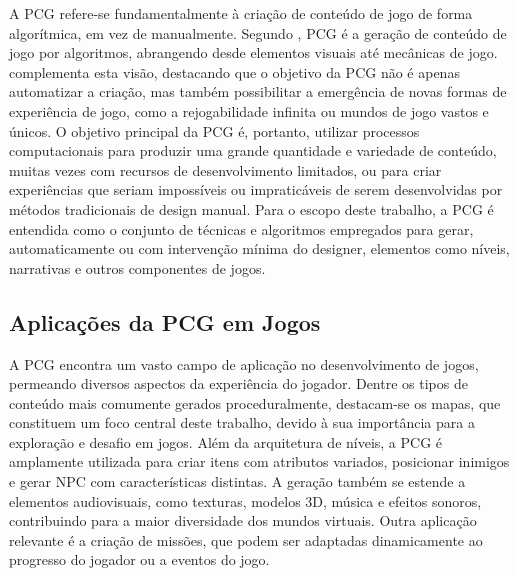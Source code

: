 A \gls{PCG} refere-se fundamentalmente à criação de conteúdo de jogo de forma
algorítmica, em vez de manualmente. Segundo ,
\gls{PCG} é a geração de conteúdo de jogo por algoritmos, abrangendo desde
elementos visuais até mecânicas de jogo.  complementa esta
visão, destacando que o objetivo da \gls{PCG} não é apenas automatizar a
criação, mas também possibilitar a emergência de novas formas de experiência de
jogo, como a rejogabilidade infinita ou mundos de jogo vastos e únicos. O
objetivo principal da \gls{PCG} é, portanto, utilizar processos computacionais
para produzir uma grande quantidade e variedade de conteúdo, muitas vezes com
recursos de desenvolvimento limitados, ou para criar experiências que seriam
impossíveis ou impraticáveis de serem desenvolvidas por métodos tradicionais de
design manual. Para o escopo deste trabalho, a \gls{PCG} é entendida como o
conjunto de técnicas e algoritmos empregados para gerar, automaticamente ou com
intervenção mínima do designer, elementos como níveis, narrativas e outros
componentes de jogos.

\subsection{Aplicações da \texorpdfstring{\gls{PCG}}{PCG} em Jogos}
\label{subsec:aplicacoes_pcg}

A \gls{PCG} encontra um vasto campo de aplicação no desenvolvimento de jogos,
permeando diversos aspectos da experiência do jogador. Dentre os tipos de
conteúdo mais comumente gerados proceduralmente, destacam-se os mapas, que
constituem um foco central deste trabalho, devido à sua importância para a
exploração e desafio em jogos. Além da arquitetura de
níveis, a \gls{PCG} é amplamente utilizada para criar itens com atributos
variados, posicionar inimigos e gerar \gls{NPC} com características distintas.
A geração também se estende a elementos audiovisuais, como texturas, modelos 3D,
música e efeitos sonoros, contribuindo para a maior diversidade dos mundos
virtuais. Outra aplicação relevante é a criação de missões,
que podem ser adaptadas dinamicamente ao progresso do jogador ou a eventos do
jogo.

